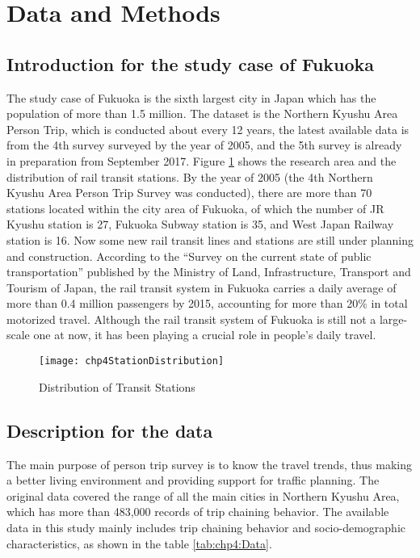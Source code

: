 %
\section{Data and Methods}
%
\subsection{Introduction for the study case of Fukuoka}
The study case of Fukuoka is the sixth largest city in Japan which has the population of more than 1.5 million. The dataset is the Northern Kyushu Area Person Trip, which is conducted about every 12 years, the latest available data is from the 4th survey surveyed by the year of 2005, and the 5th survey is already in preparation from September 2017. Figure \ref{fig:chp4:StationDistribution} shows the research area and the distribution of rail transit stations. By the year of 2005 (the 4th Northern Kyushu Area Person Trip Survey was conducted), there are more than 70 stations located within the city area of Fukuoka, of which the number of JR Kyushu station is 27, Fukuoka Subway station is 35, and West Japan Railway station is 16. Now some new rail transit lines and stations are still under planning and construction. According to the “Survey on the current state of public transportation” published by the Ministry of Land, Infrastructure, Transport and Tourism of Japan, the rail transit system in Fukuoka carries a daily average of more than 0.4 million passengers by 2015, accounting for more than 20\% in total motorized travel. Although the rail transit system of Fukuoka is still not a large-scale one at now, it has been playing a crucial role in people's daily travel.

\begin{figure}[htp]
	\caption{Distribution of Transit Stations}
	\label{fig:chp4:StationDistribution}
	\centering
	\texttt{[image: chp4StationDistribution]}
\end{figure}

%
\subsection{Description for the data}
The main purpose of person trip survey is to know the travel trends, thus making a better living environment and providing support for traffic planning. The original data covered the range of all the main cities in Northern Kyushu Area, which has more than 483,000 records of trip chaining behavior. The available data in this study mainly includes trip chaining behavior and socio-demographic characteristics, as shown in the table \ref{tab:chp4:Data}.

